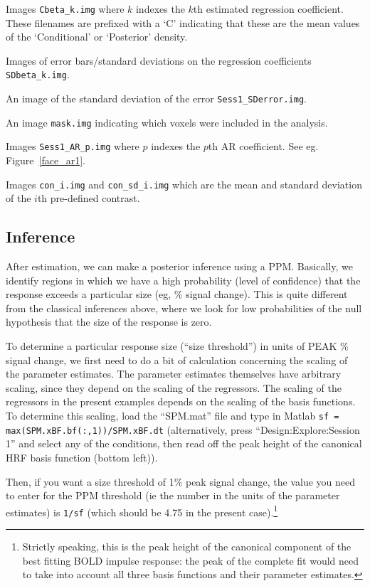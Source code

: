 \item{Images   \verb!Cbeta_k.img! where $k$ indexes the $k$th estimated regression coefficient. These filenames are prefixed with a `C' indicating that these
are the mean values of the `Conditional' or `Posterior' density.}
\item{Images of error bars/standard deviations on the regression coefficients \verb!SDbeta_k.img!.}
\item{An image of the standard deviation of the 
error \verb!Sess1_SDerror.img!.}
\item{An image \verb!mask.img! indicating which voxels 
were included in the analysis.}
\item{Images \verb!Sess1_AR_p.img! where $p$ indexes the $p$th AR coefficient. See eg. Figure~\ref{face_ar1}.}
\item{Images \verb!con_i.img! and \verb!con_sd_i.img! which are the mean and standard deviation of the $i$th pre-defined contrast.} 
\ei

\subsection{Inference}

After estimation, we can make a posterior inference using a PPM. Basically, we identify regions in which we have a high probability (level of confidence) that the response exceeds a particular size (eg, \% signal change). This is quite different from the classical inferences above, where we look for low probabilities of the null hypothesis that the size of the response is zero.

To determine a particular response size (``size threshold'') in units of PEAK \% signal change, we first need to do a bit of calculation concerning the scaling of the parameter estimates. The parameter estimates themselves have arbitrary scaling, since they depend on the scaling of the regressors. The scaling of the regressors in the present examples depends on the scaling of the basis functions. To determine this scaling, load the ``SPM.mat'' file and type in Matlab \verb!sf = max(SPM.xBF.bf(:,1))/SPM.xBF.dt! (alternatively, press ``Design:Explore:Session 1'' and select any of the conditions, then read off the peak height of the canonical HRF basis function (bottom left)).

Then, if you want a size threshold of 1\% peak signal change, the value you need to enter for the PPM threshold (ie the number in the units of the parameter estimates) is \verb!1/sf! (which should be 4.75 in the present case).\footnote{Strictly speaking, this is the peak height of the canonical component of the best fitting BOLD impulse response: the peak of the complete fit would need to take into account all three basis functions and their parameter estimates.}

